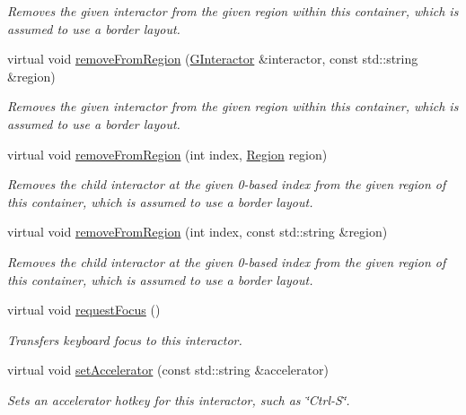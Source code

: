 \begin{DoxyCompactItemize}
\begin{DoxyCompactList}\small\item\em Removes the given interactor from the given region within this container, which is assumed to use a border layout. \end{DoxyCompactList}\item 
virtual void \mbox{\hyperlink{classGContainer_af7a055c83c0e0e3f3722596d7111fcbe}{remove\+From\+Region}} (\mbox{\hyperlink{classGInteractor}{G\+Interactor}} \&interactor, const std\+::string \&region)
\begin{DoxyCompactList}\small\item\em Removes the given interactor from the given region within this container, which is assumed to use a border layout. \end{DoxyCompactList}\item 
virtual void \mbox{\hyperlink{classGContainer_a15e3a1d3f3abecc00d68d6df2349f360}{remove\+From\+Region}} (int index, \mbox{\hyperlink{classGContainer_a81a01a86de31071a92e6cce0bab9bc4b}{Region}} region)
\begin{DoxyCompactList}\small\item\em Removes the child interactor at the given 0-\/based index from the given region of this container, which is assumed to use a border layout. \end{DoxyCompactList}\item 
virtual void \mbox{\hyperlink{classGContainer_ac839e32fec6ea6b37f6c6da8aa6ce43b}{remove\+From\+Region}} (int index, const std\+::string \&region)
\begin{DoxyCompactList}\small\item\em Removes the child interactor at the given 0-\/based index from the given region of this container, which is assumed to use a border layout. \end{DoxyCompactList}\item 
virtual void \mbox{\hyperlink{classGInteractor_a519fb2ac767f8b2febbb50b898b8c8cb}{request\+Focus}} ()
\begin{DoxyCompactList}\small\item\em Transfers keyboard focus to this interactor. \end{DoxyCompactList}\item 
virtual void \mbox{\hyperlink{classGInteractor_ad15f102f62e2960576012f1aa0ba4b2e}{set\+Accelerator}} (const std\+::string \&accelerator)
\begin{DoxyCompactList}\small\item\em Sets an accelerator hotkey for this interactor, such as \char`\"{}\+Ctrl-\/\+S\char`\"{}. \end{DoxyCompactList}\item 

\end{DoxyCompactItemize}

